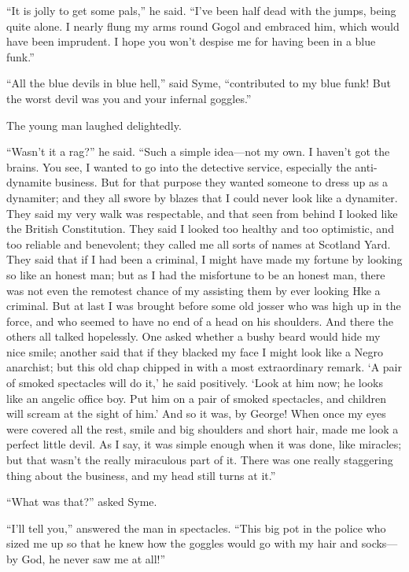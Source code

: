 \documentclass{book}
\begin{document}
“It is jolly to get some pals,” he said. “I’ve been half dead with the jumps, being quite alone. I nearly flung my arms round Gogol and embraced him, which would have been imprudent. I hope you won’t despise me for having been in a blue funk.”

“All the blue devils in blue hell,” said Syme, “contributed to my blue funk! But the worst devil was you and your infernal goggles.”

The young man laughed delightedly.

“Wasn’t it a rag?” he said. “Such a simple idea—not my own. I haven’t got the brains. You see, I wanted to go into the detective service, especially the anti-dynamite business. But for that purpose they wanted someone to dress up as a dynamiter; and they all swore by blazes that I could never look like a dynamiter. They said my very walk was respectable, and that seen from behind I looked like the British Constitution. They said I looked too healthy and too optimistic, and too reliable and benevolent; they called me all sorts of names at Scotland Yard. They said that if I had been a criminal, I might have made my fortune by looking so like an honest man; but as I had the misfortune to be an honest man, there was not even the remotest chance of my assisting them by ever looking Hke a criminal. But at last I was brought before some old josser who was high up in the force, and who seemed to have no end of a head on his shoulders. And there the others all talked hopelessly. One asked whether a bushy beard would hide my nice smile; another said that if they blacked my face I might look like a Negro anarchist; but this old chap chipped in with a most extraordinary remark. ‘A pair of smoked spectacles will do it,’ he said positively. ‘Look at him now; he looks like an angelic office boy. Put him on a pair of smoked spectacles, and children will scream at the sight of him.’ And so it was, by George! When once my eyes were covered all the rest, smile and big shoulders and short hair, made me look a perfect little devil. As I say, it was simple enough when it was done, like miracles; but that wasn’t the really miraculous part of it. There was one really staggering thing about the business, and my head still turns at it.”

“What was that?” asked Syme.

“I’ll tell you,” answered the man in spectacles. “This big pot in the police who sized me up so that he knew how the goggles would go with my hair and socks—by God, he never saw me at all!”
\end{document}
